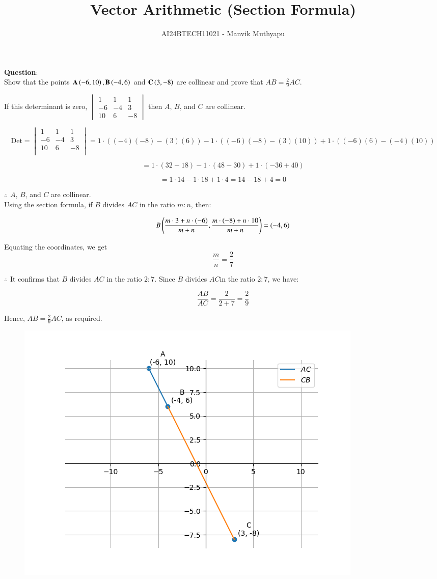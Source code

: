 \documentclass[journal,12pt,onecolumn]{IEEEtran}
\title{Vector Arithmetic (Section Formula)}
\author{AI24BTECH11021 - Manvik Muthyapu}
\theoremstyle{remark}
\begin{document}


\maketitle
\bigskip

\renewcommand{\thefigure}{\theenumi}
\renewcommand{\thetable}{\theenumi}

\textbf{Question}:\\

Show that the points $\textbf{A}\left(-6,10\right),\textbf{B}\left(-4,6\right)$ and $\textbf{C}\left(3,-8\right)$ are collinear and prove that $AB = \frac{2}{9}AC$.\\
		
\solution 

If this determinant is zero, 
$\begin{vmatrix}
1 & 1 & 1 \\
-6 & -4 & 3 \\
10 & 6 & -8
\end{vmatrix}
$
then $A$, $B$, and $C$ are collinear.

$$
\text{Det} =
\begin{vmatrix}
1 & 1 & 1 \\
-6 & -4 & 3 \\
10 & 6 & -8 \\
\end{vmatrix}
= 1 \cdot \left((-4)(-8) - (3)(6)\right) - 1 \cdot \left((-6)(-8) - (3)(10)\right) + 1 \cdot \left((-6)(6) - (-4)(10)\right)$$

$$= 1 \cdot (32 - 18) - 1 \cdot (48 - 30) + 1 \cdot (-36 + 40)$$

$$= 1 \cdot 14 - 1 \cdot 18 + 1 \cdot 4 = 14 - 18 + 4 = 0$$


$\therefore$ $A$, $B$, and $C$ are collinear.\\

Using the section formula, if $B$ divides $AC$ in the ratio $m:n$, then:

$$B\left(\frac{m \cdot 3 + n \cdot (-6)}{m+n}, \frac{m \cdot (-8) + n \cdot 10}{m+n}\right) = (-4, 6)$$

Equating the coordinates, we get 
$$\frac{m}{n} = \frac{2}{7}$$


$\therefore$ It confirms that $B$ divides $AC$ in the ratio $2:7$.
Since $B$ divides $AC$in the ratio $2:7$, we have:

$$\frac{AB}{AC} = \frac{2}{2+7} = \frac{2}{9}$$

Hence, $AB = \frac{2}{9} AC$, as required.

\begin{figure}[h!]
	\centering
	\includegraphics[width=0.7\linewidth]{figs/fig1.png}
\end{figure}
\end{document}
